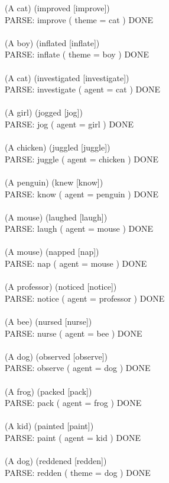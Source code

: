 \documentclass{article} \usepackage{iclr2022_conference,times}
\begin{document}
{(A cat) (improved [improve]) \\
PARSE: improve ( theme = cat ) DONE \\
 \\
(A boy) (inflated [inflate]) \\
PARSE: inflate ( theme = boy ) DONE \\
 \\
(A cat) (investigated [investigate]) \\
PARSE: investigate ( agent = cat ) DONE \\
 \\
(A girl) (jogged [jog]) \\
PARSE: jog ( agent = girl ) DONE \\
 \\
(A chicken) (juggled [juggle]) \\
PARSE: juggle ( agent = chicken ) DONE \\
 \\
(A penguin) (knew [know]) \\
PARSE: know ( agent = penguin ) DONE \\
 \\
(A mouse) (laughed [laugh]) \\
PARSE: laugh ( agent = mouse ) DONE \\
 \\
(A mouse) (napped [nap]) \\
PARSE: nap ( agent = mouse ) DONE \\
 \\
(A professor) (noticed [notice]) \\
PARSE: notice ( agent = professor ) DONE \\
 \\
(A bee) (nursed [nurse]) \\
PARSE: nurse ( agent = bee ) DONE \\
 \\
(A dog) (observed [observe]) \\
PARSE: observe ( agent = dog ) DONE \\
 \\
(A frog) (packed [pack]) \\
PARSE: pack ( agent = frog ) DONE \\
 \\
(A kid) (painted [paint]) \\
PARSE: paint ( agent = kid ) DONE \\
 \\
(A dog) (reddened [redden]) \\
PARSE: redden ( theme = dog ) DONE \\
}
\end{document}
